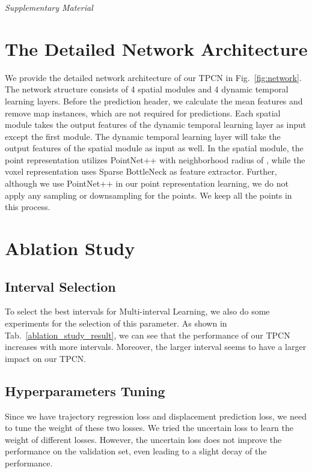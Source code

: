 \documentclass[final]{cvpr}
\begin{document}
{\small


}

\clearpage
\setcounter{section}{0}
\setcounter{figure}{0}
\setcounter{table}{0}

\begin{center}
    \LARGE{\textit{Supplementary Material}}
\end{center}
\vspace{20pt}

\section{The Detailed Network Architecture}
\label{sec:detailed_net}
We provide the detailed network architecture of our TPCN in Fig.~\ref{fig:network}. The network structure consists of 4 spatial modules and 4 dynamic temporal learning layers. Before the prediction header, we calculate the mean features and remove map instances, which are not required for predictions. Each spatial module takes the output features of the dynamic temporal learning layer as input except the first module. The dynamic temporal learning layer will take the output features of the spatial module as input as well. In the spatial module, the point representation utilizes PointNet++ with neighborhood radius of , while the voxel representation uses Sparse BottleNeck as feature extractor. Further, although we use PointNet++ in our point representation learning, we do not apply any sampling or downsampling for the points. We keep all the points in this process.

\section{Ablation Study}
\label{sec:ablation}
\subsection{Interval Selection}
To select the best intervals for Multi-interval Learning, we also do some experiments for the selection of this parameter. As shown in Tab.~\ref{ablation_study_result}, we can see that the performance of our TPCN increases with more intervals. Moreover, the larger interval seems to have a larger impact on our TPCN.
\subsection{Hyperparameters Tuning}
Since we have trajectory regression loss and displacement prediction loss, we need to tune the weight of these two losses. We tried the uncertain loss to learn the weight of different losses. However, the uncertain loss does not improve the performance on the validation set, even leading to a slight decay of the performance. 
\end{document}
